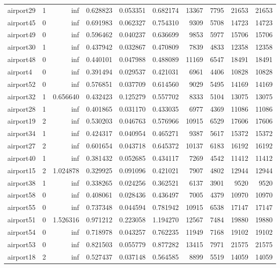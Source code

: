 \begin{longtable}{|l|r|r|r|r|r|r|r|r|r|}
airport29 & 1 & inf & 0.628823 & 0.053351 & 0.682174 & 13367 & 7795 & 21653 & 21653 \\
airport45 & 0 & inf & 0.691983 & 0.062327 & 0.754310 & 9309 & 5708 & 14723 & 14723 \\
airport49 & 0 & inf & 0.596462 & 0.040237 & 0.636699 & 9853 & 5977 & 15706 & 15706 \\
airport30 & 1 & inf & 0.437942 & 0.032867 & 0.470809 & 7839 & 4833 & 12358 & 12358 \\
airport48 & 0 & inf & 0.440101 & 0.047988 & 0.488089 & 11169 & 6547 & 18491 & 18491 \\
airport4 & 0 & inf & 0.391494 & 0.029537 & 0.421031 & 6961 & 4406 & 10828 & 10828 \\
airport52 & 0 & inf & 0.576851 & 0.037709 & 0.614560 & 9029 & 5495 & 14169 & 14169 \\
airport32 & 1 & 0.656640 & 0.432423 & 0.125279 & 0.557702 & 8333 & 5104 & 13075 & 13075 \\
airport28 & 1 & inf & 0.401865 & 0.031170 & 0.433035 & 6977 & 4369 & 11086 & 11086 \\
airport19 & 2 & inf & 0.530203 & 0.046763 & 0.576966 & 10915 & 6529 & 17606 & 17606 \\
airport34 & 1 & inf & 0.424317 & 0.040954 & 0.465271 & 9387 & 5617 & 15372 & 15372 \\
airport27 & 2 & inf & 0.601654 & 0.043718 & 0.645372 & 10137 & 6183 & 16192 & 16192 \\
airport40 & 1 & inf & 0.381432 & 0.052685 & 0.434117 & 7269 & 4542 & 11412 & 11412 \\
airport15 & 2 & 1.024878 & 0.329925 & 0.091096 & 0.421021 & 7907 & 4802 & 12944 & 12944 \\
airport38 & 1 & inf & 0.338265 & 0.024256 & 0.362521 & 6137 & 3901 & 9520 & 9520 \\
airport58 & 0 & inf & 0.408061 & 0.028436 & 0.436497 & 7005 & 4379 & 10970 & 10970 \\
airport55 & 0 & inf & 0.737348 & 0.044594 & 0.781942 & 10915 & 6538 & 17147 & 17147 \\
airport51 & 0 & 1.526316 & 0.971212 & 0.223058 & 1.194270 & 12567 & 7484 & 19880 & 19880 \\
airport54 & 0 & inf & 0.718978 & 0.043257 & 0.762235 & 11949 & 7168 & 19102 & 19102 \\
airport53 & 0 & inf & 0.821503 & 0.055779 & 0.877282 & 13415 & 7971 & 21575 & 21575 \\
airport18 & 2 & inf & 0.527437 & 0.037148 & 0.564585 & 8899 & 5519 & 14059 & 14059 \\

\end{longtable}
